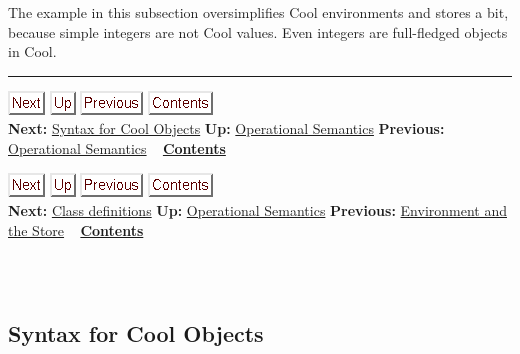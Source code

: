 \documentclass[]{article}
\begin{document}
The example in this subsection oversimplifies Cool environments and
stores a bit, because simple integers are not Cool values. Even integers
are full-fledged objects in Cool.

\begin{center}\rule{3in}{0.4pt}\end{center}

\href{node46.html}{\includegraphics{next.png}}
\href{node44.html}{\includegraphics{up.png}}
\href{node44.html}{\includegraphics{prev.png}}
\href{node1.html}{\includegraphics{contents.png}} \\ \textbf{Next:}
\href{node46.html}{Syntax for Cool Objects} \textbf{Up:}
\href{node44.html}{Operational Semantics} \textbf{Previous:}
\href{node44.html}{Operational Semantics} ~
\textbf{\href{node1.html}{Contents}}

\href{node47.html}{\includegraphics{next.png}}
\href{node44.html}{\includegraphics{up.png}}
\href{node45.html}{\includegraphics{prev.png}}
\href{node1.html}{\includegraphics{contents.png}} \\ \textbf{Next:}
\href{node47.html}{Class definitions} \textbf{Up:}
\href{node44.html}{Operational Semantics} \textbf{Previous:}
\href{node45.html}{Environment and the Store} ~
\textbf{\href{node1.html}{Contents}} \\ \\

\subsection{\\ Syntax for Cool Objects}
\end{document}
